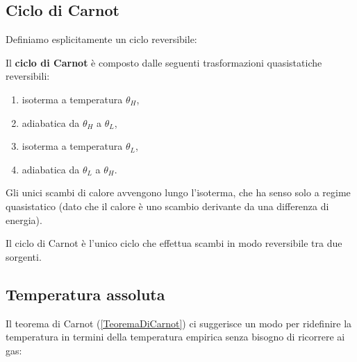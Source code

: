 \subsection{Ciclo di Carnot}
Definiamo esplicitamente un ciclo reversibile:

\begin{definition}
Il \textbf{ciclo di Carnot} \`e composto dalle seguenti trasformazioni quasistatiche reversibili:
\begin{enumerate}
\item isoterma a temperatura $\theta_H$,
\item adiabatica da $\theta_H$ a $\theta_L$, 
\item isoterma a temperatura $\theta_L$,
\item adiabatica da $\theta_L$ a $\theta_H$.
\end{enumerate}
\end{definition}


\begin{remark}
Gli unici scambi di calore avvengono lungo l'isoterma, che ha senso solo a regime quasistatico (dato che il calore \`e uno scambio derivante da una differenza di energia).
\end{remark}

\begin{fact}
Il ciclo di Carnot \`e l'unico ciclo che effettua scambi in modo reversibile tra due sorgenti.
\end{fact}

\subsection{Temperatura assoluta}
Il teorema di Carnot (\ref{TeoremaDiCarnot}) ci suggerisce un modo per ridefinire la temperatura in termini della temperatura empirica senza bisogno di ricorrere ai gas:
\medskip

